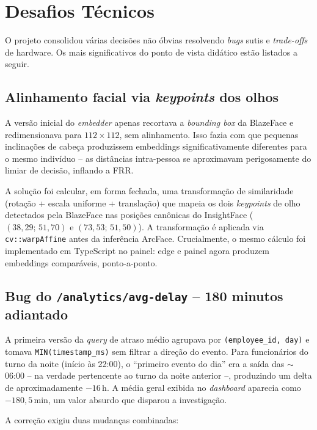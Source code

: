 \documentclass[12pt,a4paper]{report}
\begin{document}
\section{Desafios Técnicos}

O projeto consolidou várias decisões não óbvias resolvendo
\textit{bugs} sutis e \textit{trade-offs} de hardware. Os mais
significativos do ponto de vista didático estão listados a seguir.

\subsection{Alinhamento facial via \textit{keypoints} dos olhos}

A versão inicial do \textit{embedder} apenas recortava a
\textit{bounding box} da BlazeFace e redimensionava para
$112\times112$, sem alinhamento. Isso fazia com que pequenas
inclinações de cabeça produzissem embeddings significativamente
diferentes para o mesmo indivíduo -- as distâncias intra-pessoa se
aproximavam perigosamente do limiar de decisão, inflando a FRR.

A solução foi calcular, em forma fechada, uma transformação de
similaridade (rotação + escala uniforme + translação) que mapeia os
dois \textit{keypoints} de olho detectados pela BlazeFace nas
posições canônicas do InsightFace ($(38{,}29;\,51{,}70)$ e
$(73{,}53;\,51{,}50)$). A transformação é aplicada via
\texttt{cv::warpAffine} antes da inferência ArcFace. Crucialmente, o
mesmo cálculo foi implementado em TypeScript no painel: edge e painel
agora produzem embeddings comparáveis, ponto-a-ponto.

\subsection{Bug do \texttt{/analytics/avg-delay} -- 180 minutos
adiantado}
\label{sec:bug-avg-delay}

A primeira versão da \textit{query} de atraso médio agrupava por
\texttt{(employee\_id, day)} e tomava \texttt{MIN(timestamp\_ms)} sem
filtrar a direção do evento. Para funcionários do turno da noite
(início às 22:00), o ``primeiro evento do dia'' era a saída das
$\sim$06:00 -- na verdade pertencente ao turno da noite anterior --,
produzindo um delta de aproximadamente $-16\,$h. A média geral
exibida no \textit{dashboard} aparecia como $-180{,}5\,$min, um valor
absurdo que disparou a investigação.

A correção exigiu duas mudanças combinadas:
\end{document}
